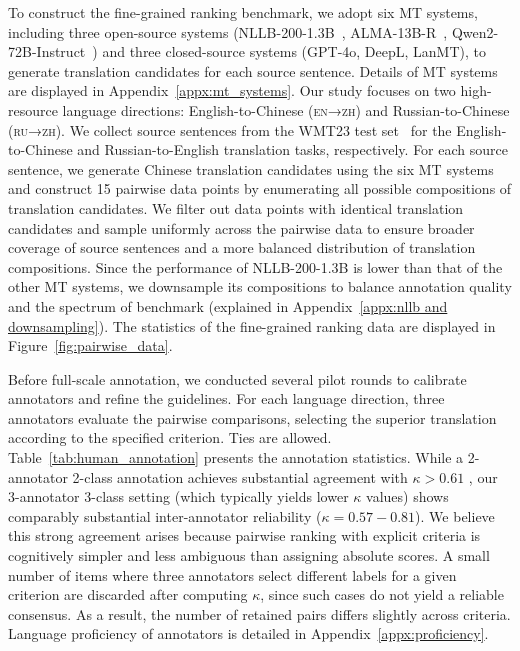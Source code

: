 \documentclass{article}
\theoremstyle{plain}
\theoremstyle{definition}
\theoremstyle{remark}
\newcommand{\enzhx}{\textsc{en→zh}}
\newcommand{\ruzhx}{\textsc{ru→zh}}
\begin{document}
To construct the fine-grained ranking benchmark, we adopt six MT systems, including three open-source systems (NLLB-200-1.3B~\citep{nllb-24}, ALMA-13B-R~\citep{DBLP:conf/icml/XuSCTSDM024}, Qwen2-72B-Instruct~\citep{Yang2024Qwen2TR}) and three closed-source systems (GPT-4o, DeepL, LanMT), to generate translation candidates for each source sentence. Details of MT systems are displayed in Appendix~\ref{appx:mt_systems}.
Our study focuses on two high-resource language directions: English-to-Chinese (\enzhx) and Russian-to-Chinese (\ruzhx). We collect source sentences from the WMT23 test set~\citep{Blain2023FindingsOT} for the English-to-Chinese and Russian-to-English translation tasks, respectively. For each source sentence, we generate Chinese translation candidates using the six MT systems and construct 15 pairwise data points by enumerating all possible compositions of translation candidates. We filter out data points with identical translation candidates and sample uniformly across the pairwise data to ensure broader coverage of source sentences and a more balanced distribution of translation compositions. Since the performance of NLLB-200-1.3B is lower than that of the other MT systems, we downsample its compositions to balance annotation quality and the spectrum of benchmark (explained in Appendix~\ref{appx:nllb and downsampling}). The statistics of the fine-grained ranking data are displayed in Figure~\ref{fig:pairwise_data}.

 Before full-scale annotation, we conducted several pilot rounds to calibrate annotators and refine the guidelines. For each language direction, three annotators evaluate the pairwise comparisons, selecting the superior translation according to the specified criterion. Ties are allowed. Table~\ref{tab:human_annotation} presents the annotation statistics.  While a 2-annotator 2-class annotation achieves substantial agreement with $\kappa>0.61$ \citep{Landis1977TheMO}, our 3-annotator 3-class setting (which typically yields lower $\kappa$ values) shows comparably substantial inter-annotator reliability ($\kappa=0.57-0.81$). We believe this strong agreement arises because pairwise ranking with explicit criteria is cognitively simpler and less ambiguous than assigning absolute scores. A small number of items where three annotators select different labels for a given criterion are discarded after computing $\kappa$, since such cases do not yield a reliable consensus. As a result, the number of retained pairs differs slightly across criteria.
Language proficiency of annotators is detailed in Appendix~\ref{appx:proficiency}.
\end{document}
